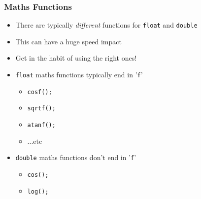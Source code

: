 \documentclass[14pt]{beamer}
\begin{document}
\begin{frame}
\frametitle{Maths Functions}
\begin{itemize}
\item There are typically \textit{different} functions for \texttt{float} and \texttt{double}
\item This can have a huge speed impact
\item Get in the habit of using the right ones!
\item \texttt{float} maths functions typically end in '\texttt{f}'
	\begin{itemize}
		\item \texttt{cosf();}
		\item \texttt{sqrtf();}
		\item \texttt{atanf();}
		\item ...etc
	\end{itemize}
\item \texttt{double} maths functions don't end in '\texttt{f}'
	\begin{itemize}
		\item \texttt{cos();}
		\item \texttt{log();}
	\end{itemize}
\end{itemize}
\end{frame}
\end{document}

